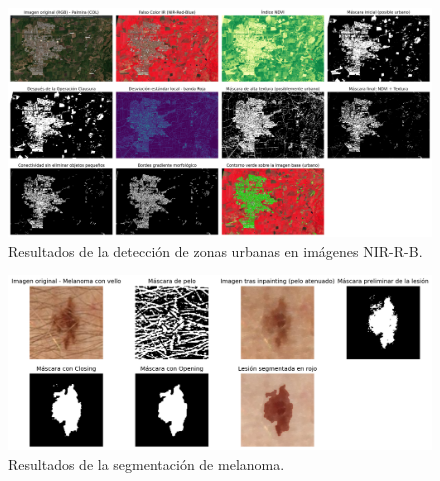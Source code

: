 \begin{figure}[t]
    \centering
    \includegraphics[height=0.3\textwidth]{./figures/drive/Procesado_Imagen_satelital_Palmira.png}
    \caption{Resultados de la detección de zonas urbanas en imágenes NIR-R-B.}
    \label{fig:palmira_results}
\end{figure}

\begin{figure}[t]
    \centering
    \includegraphics[height=0.3\textwidth]{figures/drive/Procesado_Imagen_Melanoma.png}
    \caption{Resultados de la segmentación de melanoma.}
    \label{fig:melanoma_results}
\end{figure}